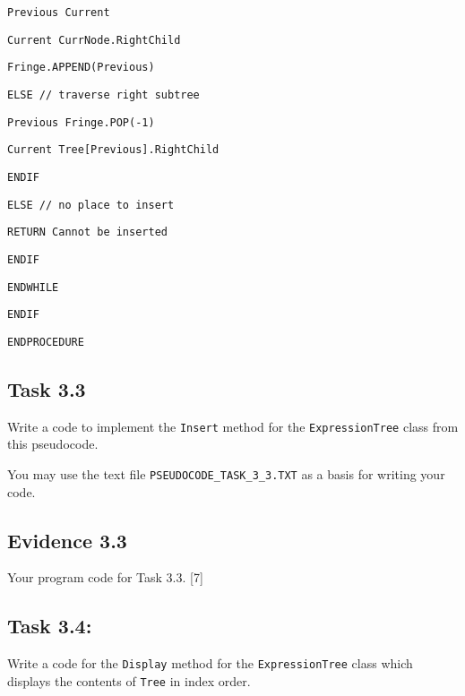 \begin{minipage}[t]{0.88\columnwidth}
\texttt{\qquad{}\qquad{}\qquad{}\qquad{}\qquad{}Previous Current}

\texttt{\qquad{}\qquad{}\qquad{}\qquad{}\qquad{}Current CurrNode.RightChild }

\texttt{\qquad{}\qquad{}\qquad{}\qquad{}\qquad{}Fringe.APPEND(Previous) }

\texttt{\qquad{}\qquad{}\qquad{}\qquad{}ELSE // traverse right
subtree }

\texttt{\qquad{}\qquad{}\qquad{}\qquad{}\qquad{}Previous Fringe.POP(-1) }

\texttt{\qquad{}\qquad{}\qquad{}\qquad{}\qquad{}Current Tree{[}Previous{]}.RightChild}

\texttt{\qquad{}\qquad{}\qquad{}\qquad{}ENDIF }

\texttt{\qquad{}\qquad{}\qquad{}ELSE // no place to insert}

\texttt{\qquad{}\qquad{}\qquad{}\qquad{}RETURN \textquotedbl Cannot
be inserted\textquotedbl{} }

\texttt{\qquad{}\qquad{}\qquad{}ENDIF }

\texttt{\qquad{}\qquad{}ENDWHILE}

\texttt{\qquad{}ENDIF}

\texttt{ENDPROCEDURE}%
\end{minipage}

\subsection*{Task 3.3 }

Write a code to implement the \texttt{Insert} method for the \texttt{ExpressionTree}
class from this pseudocode.

You may use the text file \texttt{PSEUDOCODE\_TASK\_3\_3.TXT} as a
basis for writing your code.

\subsection*{Evidence 3.3 }

Your program code for Task 3.3. \hfill{}{[}7{]}

\subsection*{Task 3.4: }

Write a code for the \texttt{Display} method for the \texttt{ExpressionTree}
class which displays the contents of \texttt{Tree} in index order. 

